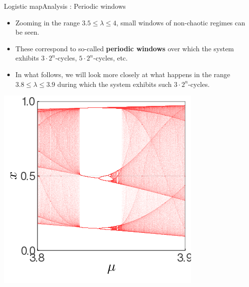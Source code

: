 \documentclass[usenames,dvipsnames,svgnames,10pt,aspectratio=169]{beamer}
\begin{document}
\begin{frame}[t, c]{Logistic map}{Analysis : Periodic windows}
	\begin{minipage}{.68\textwidth}
		\begin{itemize}
			\item Zooming in the range \(3.5 \leq \lambda \leq 4 \), small windows of non-chaotic regimes can be seen.

			\bigskip

			\item These correspond to so-called \textbf{periodic windows} over which the system exhibits \(3 \cdot 2^n\)-cycles, \(5 \cdot 2^n\)-cycles, etc.

			\bigskip

			\item In what follows, we will look more closely at what happens in the range \( 3.8 \leq \lambda \leq 3.9 \) during which the system exhibits such \(3 \cdot 2^n\)-cycles.
		\end{itemize}
	\end{minipage}%
	\hfill
	\begin{minipage}{.28\textwidth}
		\centering
		\includegraphics[width=\textwidth]{orbit_diagram_b}
	\end{minipage}

	\vspace{1cm}
\end{frame}
\end{document}
